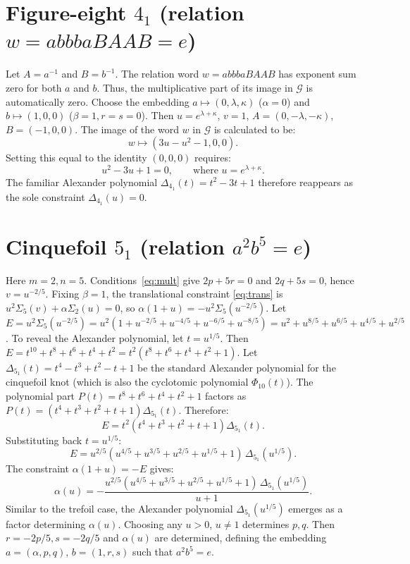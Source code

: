 \documentclass{article}
\begin{document}
\section{Figure-eight $4_1$ (relation $w = abbbaBAAB = e$)}
Let $A=a^{-1}$ and $B=b^{-1}$. The relation word $w = abbbaBAAB$ has exponent sum zero for both $a$ and $b$. Thus, the multiplicative part of its image in $\mathcal{G}$ is automatically zero.
Choose the embedding $a \mapsto (0,\lambda,\kappa)$ ($\alpha=0$) and $b \mapsto (1,0,0)$ ($\beta=1, r=s=0$). Then $u=e^{\lambda+\kappa}$, $v=1$, $A=(0,-\lambda,-\kappa)$, $B=(-1,0,0)$.
The image of the word $w$ in $\mathcal{G}$ is calculated to be:
\begin{equation}
w \longmapsto (3u-u^2-1, 0, 0).
\end{equation}
Setting this equal to the identity $(0,0,0)$ requires:
\begin{equation}
u^2-3u+1=0, \qquad \text{where } u=e^{\lambda+\kappa}.
\end{equation}
The familiar Alexander polynomial $\Delta_{4_1}(t)=t^{2}-3t+1$ therefore reappears as the sole constraint $\Delta_{4_1}(u)=0$.

\section{Cinquefoil $5_1$ (relation $a^{2}b^{5}=e$)}
Here $m=2, n=5$. Conditions~\eqref{eq:mult} give $2p+5r=0$ and $2q+5s=0$, hence $v=u^{-2/5}$.
Fixing $\beta=1$, the translational constraint \eqref{eq:trans} is $u^2 \Sigma_5(v) + \alpha \Sigma_2(u) = 0$, so $\alpha(1+u) = -u^2 \Sigma_5(u^{-2/5})$.
Let $E = u^2 \Sigma_5(u^{-2/5}) = u^2(1+u^{-2/5}+u^{-4/5}+u^{-6/5}+u^{-8/5}) = u^{2}+u^{8/5}+u^{6/5}+u^{4/5}+u^{2/5}$.
To reveal the Alexander polynomial, let $t=u^{1/5}$. Then $E = t^{10}+t^8+t^6+t^4+t^2 = t^2(t^8+t^6+t^4+t^2+1)$.
Let $\Delta_{5_1}(t) = t^4 - t^3 + t^2 - t + 1$ be the standard Alexander polynomial for the cinquefoil knot (which is also the cyclotomic polynomial $\Phi_{10}(t)$).
The polynomial part $P(t) = t^8+t^6+t^4+t^2+1$ factors as $P(t) = (t^4+t^3+t^2+t+1) \Delta_{5_1}(t)$.
Therefore:
\begin{equation*}
    E = t^2 (t^4+t^3+t^2+t+1) \Delta_{5_1}(t).
\end{equation*}
Substituting back $t=u^{1/5}$:
\begin{equation*}
    E = u^{2/5} (u^{4/5}+u^{3/5}+u^{2/5}+u^{1/5}+1) \, \Delta_{5_1}(u^{1/5}).
\end{equation*}
The constraint $\alpha(1+u) = -E$ gives:
\begin{equation}
\alpha(u) = - \frac{u^{2/5} (u^{4/5}+u^{3/5}+u^{2/5}+u^{1/5}+1) \, \Delta_{5_1}(u^{1/5})}{u+1}.
\end{equation}
Similar to the trefoil case, the Alexander polynomial $\Delta_{5_1}(u^{1/5})$ emerges as a factor determining $\alpha(u)$. Choosing any $u>0$, $u\neq1$ determines $p,q$. Then $r=-2p/5, s=-2q/5$ and $\alpha(u)$ are determined, defining the embedding $a=(\alpha,p,q)$, $b=(1,r,s)$ such that $a^2 b^5 = e$.
\end{document}
